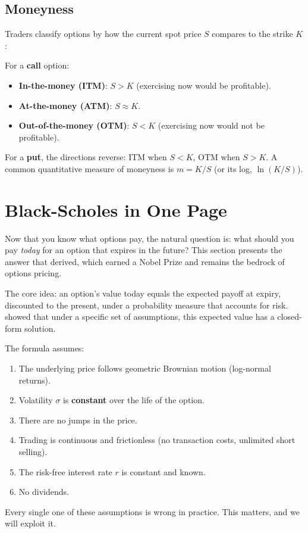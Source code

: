 \subsection{Moneyness}
\label{sec:moneyness}

Traders classify options by how the current spot price $S$ compares to the strike $K$:

\begin{definition}[Moneyness]
For a \textbf{call} option:
\begin{itemize}[nosep]
  \item \textbf{In-the-money (ITM)}: $S > K$ (exercising now would be profitable).
  \item \textbf{At-the-money (ATM)}: $S \approx K$.
  \item \textbf{Out-of-the-money (OTM)}: $S < K$ (exercising now would not be profitable).
\end{itemize}
For a \textbf{put}, the directions reverse: ITM when $S < K$, OTM when $S > K$.
A common quantitative measure of moneyness is $m = K/S$ (or its log, $\ln(K/S)$).
\end{definition}


\section{Black-Scholes in One Page}
\label{sec:black-scholes}

Now that you know what options pay, the natural question is: what should you pay \emph{today} for an option that expires in the future?
This section presents the answer that \citet{Black1973} derived, which earned a Nobel Prize and remains the bedrock of options pricing.

The core idea: an option's value today equals the expected payoff at expiry, discounted to the present, under a probability measure that accounts for risk.
\citet{Black1973} showed that under a specific set of assumptions, this expected value has a closed-form solution.

\begin{keyidea}
The formula assumes:
\begin{enumerate}[nosep]
  \item The underlying price follows geometric Brownian motion (log-normal returns).
  \item Volatility $\sigma$ is \textbf{constant} over the life of the option.
  \item There are no jumps in the price.
  \item Trading is continuous and frictionless (no transaction costs, unlimited short selling).
  \item The risk-free interest rate $r$ is constant and known.
  \item No dividends.
\end{enumerate}
Every single one of these assumptions is wrong in practice. This matters, and we will exploit it.
\end{keyidea}

